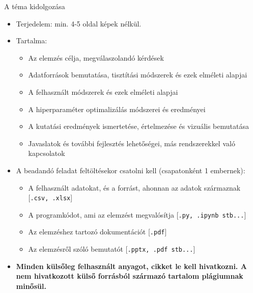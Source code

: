 \documentclass[english, aspectratio=169]{beamer}
\begin{document}
\begin{frame}{A téma kidolgozása}
\begin{itemize}
	\item Terjedelem: min. 4-5 oldal képek nélkül.\par\smallskip
	\item Tartalma:
	\begin{itemize}
		\item Az elemzés célja, megválaszolandó kérdések
		\item Adatforrások bemutatása, tisztítási módszerek és ezek elméleti alapjai
		\item A felhasznált módszerek és ezek elméleti alapjai
		\item A hiperparaméter optimalizálás módszerei és eredményei
		\item A kutatási eredmények ismertetése, értelmezése és vizuális bemutatása
		\item Javaslatok és további fejlesztés lehetőségei, más rendszerekkel való kapcsolatok
	\end{itemize}\par\smallskip
	\item A beadandó feladat feltöltésekor csatolni kell (csapatonként 1 embernek):
	\begin{itemize}
		\item A felhasznált adatokat, és a forrást, ahonnan az adatok származnak [\texttt{.csv, .xlsx}]
		\item A programkódot, ami az elemzést megvalósítja [\texttt{.py, .ipynb stb...}]
		\item Az elemzéshez tartozó dokumentációt [\texttt{.pdf}]
		\item Az elemzésről szóló bemutatót [\texttt{.pptx, .pdf stb...}]
	\end{itemize}
	\item \textbf{Minden külsőleg felhasznált anyagot, cikket le kell hivatkozni. A nem hivatkozott külső forrásból származó tartalom plágiumnak minősül.} 
\end{itemize}
\end{frame}
\end{document}
